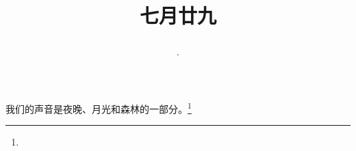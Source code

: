 \title{\date[d=1,m=9,y=2024][year:cn-y,年,month:cn,day:cn,日,·,weekday]·七月廿九 }
我们的声音是夜晚、月光和森林的一部分。\footnote{ }

